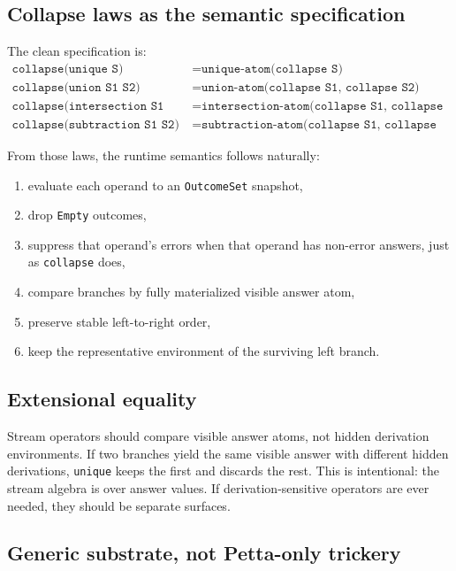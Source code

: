 \documentclass[11pt]{article}
\begin{document}
\subsection{Collapse laws as the semantic specification}

The clean specification is:
\begin{align*}
\texttt{collapse(unique S)} &= \texttt{unique-atom(collapse S)} \\
\texttt{collapse(union S1 S2)} &= \texttt{union-atom(collapse S1, collapse S2)} \\
\texttt{collapse(intersection S1 S2)} &= \texttt{intersection-atom(collapse S1, collapse S2)} \\
\texttt{collapse(subtraction S1 S2)} &= \texttt{subtraction-atom(collapse S1, collapse S2)}
\end{align*}

From those laws, the runtime semantics follows naturally:
\begin{enumerate}
    \item evaluate each operand to an \texttt{OutcomeSet} snapshot,
    \item drop \texttt{Empty} outcomes,
    \item suppress that operand's errors when that operand has non-error answers, just as \texttt{collapse} does,
    \item compare branches by fully materialized visible answer atom,
    \item preserve stable left-to-right order,
    \item keep the representative environment of the surviving left branch.
\end{enumerate}

\subsection{Extensional equality}

Stream operators should compare visible answer atoms, not hidden derivation environments. If two branches yield the same visible answer with different hidden derivations, \texttt{unique} keeps the first and discards the rest. This is intentional: the stream algebra is over answer values. If derivation-sensitive operators are ever needed, they should be separate surfaces.

\subsection{Generic substrate, not Petta-only trickery}
\end{document}

